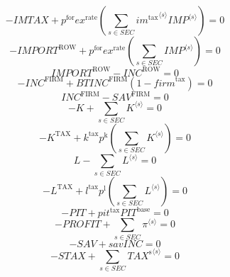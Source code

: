 \begin{equation}
-{I\!M\!T\!A\!X} + {p^{\mathrm{for}}} {{e\!x}^{\mathrm{rate}}} \left(\sum_{s\in {S\!E\!C}} {{{i\!m}^{\mathrm{tax}}}^{\langle s\rangle}} {{{I\!M\!P}}^{\langle s\rangle}}\right) = 0
\end{equation}
\begin{equation}
-{I\!M\!P\!O\!R\!T}^{\mathrm{ROW}} + {p^{\mathrm{for}}} {{e\!x}^{\mathrm{rate}}} \left(\sum_{s\in {S\!E\!C}} {{I\!M\!P}}^{\langle s\rangle}\right) = 0
\end{equation}
\begin{equation}
{I\!M\!P\!O\!R\!T}^{\mathrm{ROW}} - {I\!N\!C}^{\mathrm{ROW}} = 0
\end{equation}
\begin{equation}
-{I\!N\!C}^{\mathrm{FIRM}} + {{B\!T\!I\!N\!C}^{\mathrm{FIRM}}} \left(1 - {f\!i\!r\!m}^{\mathrm{tax}}\right) = 0
\end{equation}
\begin{equation}
{I\!N\!C}^{\mathrm{FIRM}} - {S\!A\!V}^{\mathrm{FIRM}} = 0
\end{equation}
\begin{equation}
-K + \sum_{s\in {S\!E\!C}} {K}^{\langle s\rangle} = 0
\end{equation}
\begin{equation}
-K^{\mathrm{TAX}} + {k^{\mathrm{tax}}} {p^{\mathrm{k}}} \left(\sum_{s\in {S\!E\!C}} {K}^{\langle s\rangle}\right) = 0
\end{equation}
\begin{equation}
L - \sum_{s\in {S\!E\!C}} {L}^{\langle s\rangle} = 0
\end{equation}
\begin{equation}
-L^{\mathrm{TAX}} + {l^{\mathrm{tax}}} {p^{\mathrm{l}}} \left(\sum_{s\in {S\!E\!C}} {L}^{\langle s\rangle}\right) = 0
\end{equation}
\begin{equation}
-{P\!I\!T} + {{p\!i\!t}^{\mathrm{tax}}} {{P\!I\!T}^{\mathrm{base}}} = 0
\end{equation}
\begin{equation}
-{P\!R\!O\!F\!I\!T} + \sum_{s\in {S\!E\!C}} {\pi}^{\langle s\rangle} = 0
\end{equation}
\begin{equation}
-{S\!A\!V} + {{s\!a\!v}} {{I\!N\!C}} = 0
\end{equation}
\begin{equation}
-{S\!T\!A\!X} + \sum_{s\in {S\!E\!C}} {{T\!A\!X}^{\mathrm{s}}}^{\langle s\rangle} = 0
\end{equation}
